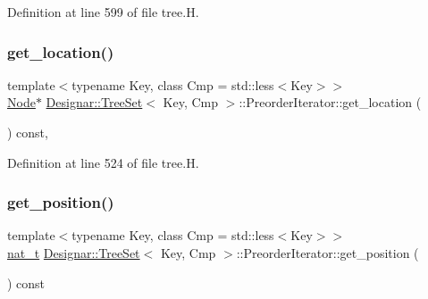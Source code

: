 Definition at line 599 of file tree.\+H.

\mbox{\label{class_designar_1_1_tree_set_1_1_preorder_iterator_a869f68f8626743605781bb18cfd13bbb}} 
\subsubsection{\texorpdfstring{get\+\_\+location()}{get\_location()}}
{\footnotesize\ttfamily template$<$typename Key, class Cmp = std\+::less$<$\+Key$>$$>$ \\
\hyperlink{class_designar_1_1_tree_set_a7409a9c1545c0e9e2fd6b84120713c99}{Node}$\ast$ \hyperlink{class_designar_1_1_tree_set}{Designar\+::\+Tree\+Set}$<$ Key, Cmp $>$\+::Preorder\+Iterator\+::get\+\_\+location (\begin{DoxyParamCaption}{ }\end{DoxyParamCaption}) const\hspace{0.3cm}{\ttfamily [inline]}, {\ttfamily [protected]}}



Definition at line 524 of file tree.\+H.

\mbox{\label{class_designar_1_1_tree_set_1_1_preorder_iterator_a76a9499f0414651a4399f57f7568b168}} 
\subsubsection{\texorpdfstring{get\+\_\+position()}{get\_position()}}
{\footnotesize\ttfamily template$<$typename Key, class Cmp = std\+::less$<$\+Key$>$$>$ \\
\hyperlink{namespace_designar_aa72662848b9f4815e7bf31a7cf3e33d1}{nat\+\_\+t} \hyperlink{class_designar_1_1_tree_set}{Designar\+::\+Tree\+Set}$<$ Key, Cmp $>$\+::Preorder\+Iterator\+::get\+\_\+position (\begin{DoxyParamCaption}{ }\end{DoxyParamCaption}) const\hspace{0.3cm}{\ttfamily [inline]}}




